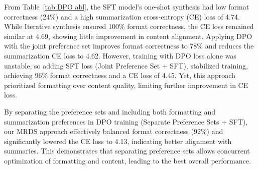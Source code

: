 From Table~\ref{tab:DPO abl}, the SFT model's one-shot synthesis had low format correctness (24\%) and a high summarization cross-entropy (CE) loss of 4.74. While Iterative synthesis ensured 100\% format correctness, the CE loss remained similar at 4.69, showing little improvement in content alignment.
Applying DPO with the joint preference set improves format correctness to 78\% and reduces the summarization CE loss to 4.62. However, training with DPO loss alone was unstable, so adding SFT loss ({Joint Preference Set + SFT}), stabilized training, achieving 96\% format correctness and a CE loss of 4.45. Yet, this approach prioritized formatting over content quality, limiting further improvement in CE loss.

By separating the preference sets and including both formatting and summarization preferences in DPO training ({Separate Preference Sets + SFT}), our MRDS approach effectively balanced format correctness (92\%) and significantly lowered the CE loss to 4.13, indicating better alignment with summaries. This demonstrates that separating preference sets allows concurrent optimization of formatting and content, leading to the best overall performance.




